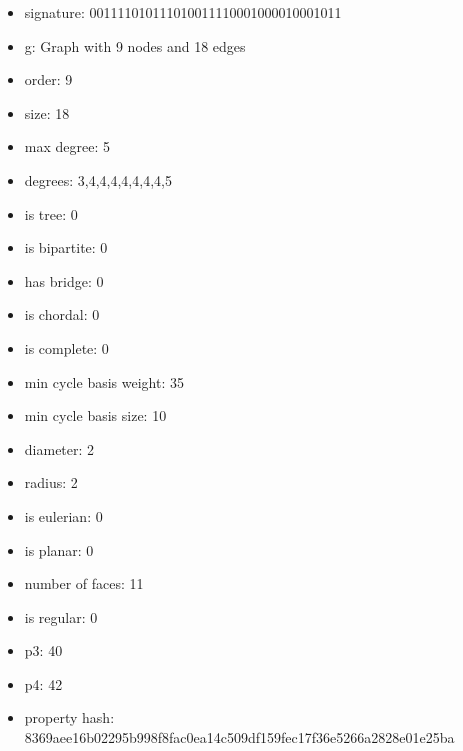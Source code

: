 \newpage
\begin{figure}
\end{figure}
\begin{itemize}
\item signature: 001111010111010011110001000010001011
\item g: Graph with 9 nodes and 18 edges
\item order: 9
\item size: 18
\item max degree: 5
\item degrees: 3,4,4,4,4,4,4,4,5
\item is tree: 0
\item is bipartite: 0
\item has bridge: 0
\item is chordal: 0
\item is complete: 0
\item min cycle basis weight: 35
\item min cycle basis size: 10
\item diameter: 2
\item radius: 2
\item is eulerian: 0
\item is planar: 0
\item number of faces: 11
\item is regular: 0
\item p3: 40
\item p4: 42
\item property hash: 8369aee16b02295b998f8fac0ea14c509df159fec17f36e5266a2828e01e25ba
\end{itemize}
